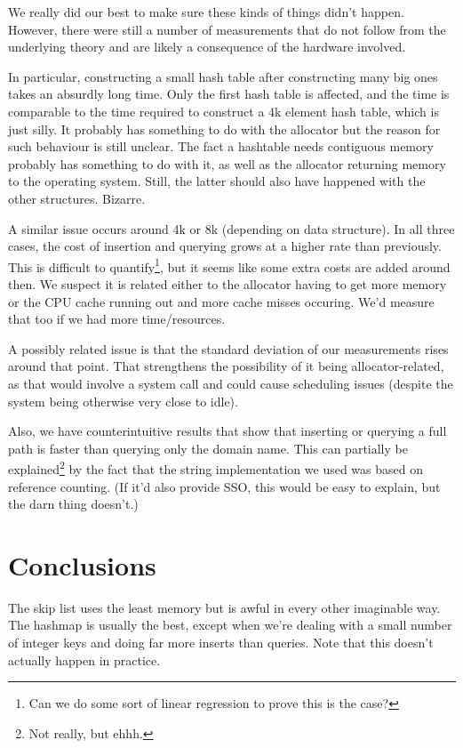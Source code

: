 \documentclass[12pt,a4paper]{article}
\begin{document}
    We really did our best to make sure these kinds of things didn't happen.  However, there were
    still a number of measurements that do not follow from the underlying theory and are likely a
    consequence of the hardware involved.

    In particular, constructing a small hash table after constructing many big ones takes an
    absurdly long time.  Only the first hash table is affected, and the time is comparable to the
    time required to construct a 4k element hash table, which is just silly.  It probably has
    something to do with the allocator but the reason for such behaviour is still unclear.  The fact
    a hashtable needs contiguous memory probably has something to do with it, as well as the
    allocator returning memory to the operating system.  Still, the latter should also have happened
    with the other structures.  Bizarre.

    A similar issue occurs around 4k or 8k (depending on data structure).  In all three cases, the
    cost of insertion and querying grows at a higher rate than previously.  This is difficult to
    quantify\footnote{Can we do some sort of linear regression to prove this is the case?}, but it
    seems like some extra costs are added around then.  We suspect it is related either to the
    allocator having to get more memory or the CPU cache running out and more cache misses occuring.
    We'd measure that too if we had more time/resources.

    A possibly related issue is that the standard deviation of our measurements rises around that
    point.  That strengthens the possibility of it being allocator-related, as that would involve a
    system call and could cause scheduling issues (despite the system being otherwise very close to
    idle).

    Also, we have counterintuitive results that show that inserting or querying a full path is
    faster than querying only the domain name.  This can partially be explained\footnote{Not really,
    but ehhh.} by the fact that the string implementation we used was based on reference counting.
    (If it'd also provide SSO, this would be easy to explain, but the darn thing doesn't.)


    \section{Conclusions}

    The skip list uses the least memory but is awful in every other imaginable way.  The hashmap is
    usually the best, except when we're dealing with a small number of integer keys and doing far more
    inserts than queries.  Note that this doesn't actually happen in practice.

    

    
\end{document}
